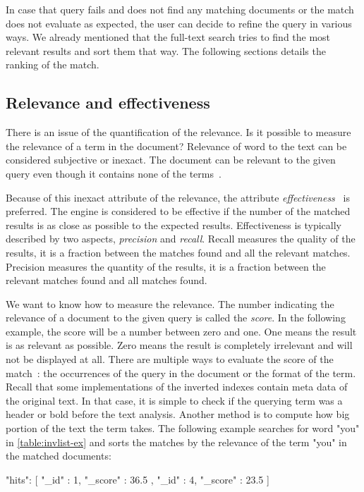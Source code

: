 In case that query fails and does not find any matching documents or the match does not evaluate as expected, the user can decide to refine the query in various ways. We already mentioned that the full-text search tries to find the most relevant results and sort them that way. The following sections details the ranking of the match.

\subsection{Relevance and effectiveness}
There is an issue of the quantification of the relevance. Is it possible to measure the relevance of a term in the document?
Relevance of word to the text can be considered subjective or inexact. The document can be relevant to the given query even though it contains none of the terms~\cite{invertedfiles}.

Because of this inexact attribute of the relevance, the attribute \emph{effectiveness}~\cite{invertedfiles} is preferred. The engine is considered to be effective if the number of the matched results is as close as possible to the expected results.
Effectiveness is typically described by two aspects, \emph{precision} and \emph{recall}. Recall measures the quality of the results, it is a fraction between the matches found and all the relevant matches. Precision measures the quantity of the results, it is a fraction between the relevant matches found and all matches found.
 
We want to know how to measure the relevance. The number indicating the relevance of a document to the given query is called the \emph{score}. In the following example, the score will be a number between zero and one. One means the result is as relevant as possible. Zero means the result is completely irrelevant and will not be displayed at all.
There are multiple ways to evaluate the score of the match~\cite{elastic}: the occurrences of the query in the document or the format of the term. Recall that some implementations of the inverted indexes contain meta data of the original text. In that case, it is simple to check if the querying term was a header or bold before the text analysis. Another method is to compute how big portion of the text the term takes. The following example searches for word "you" in \autoref{table:invlist-ex} and sorts the matches by the relevance of the term "you" in the matched documents:

 \begin{code}
{ "hits": [ { 
      "_id" : 1,
      "_score" : 36.5
    },
    { 
      "_id" : 4,
      "_score" : 23.5
} ] }
\end{code}

